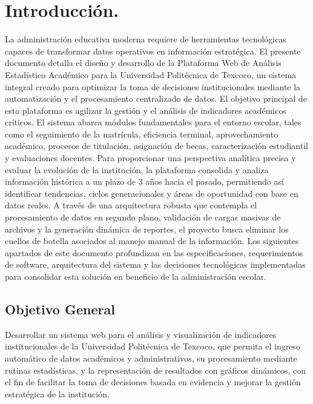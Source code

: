 \chapter{Introducción.}

 La administración educativa moderna requiere de herramientas tecnológicas capaces de transformar datos operativos en información estratégica. El presente documento detalla el diseño y desarrollo de la Plataforma Web de Análisis Estadístico Académico para la Universidad Politécnica de Texcoco, un sistema integral creado para optimizar la toma de decisiones institucionales mediante la automatización y el procesamiento centralizado de datos. El objetivo principal de esta plataforma es agilizar la gestión y el análisis de indicadores académicos críticos. 
 El sistema abarca módulos fundamentales para el entorno escolar, tales como el seguimiento de la matrícula, eficiencia terminal, aprovechamiento académico, procesos de titulación, asignación de becas, caracterización estudiantil y evaluaciones docentes. Para proporcionar una perspectiva analítica precisa y evaluar la evolución de la institución, la plataforma consolida y analiza información histórica a un plazo de 3 años hacia el pasado, permitiendo así identificar tendencias, ciclos generacionales y áreas de oportunidad con base en datos reales.  
 A través de una arquitectura robusta que contempla el procesamiento de datos en segundo plano, validación de cargas masivas de archivos y la generación dinámica de reportes, el proyecto busca eliminar los cuellos de botella asociados al manejo manual de la información. Los siguientes apartados de este documento profundizan en las especificaciones, requerimientos de software, arquitectura del sistema y las decisiones tecnológicas implementadas para consolidar esta solución en beneficio de la administración escolar.




 \section{Objetivo General}

Desarrollar un sistema web para el análisis y visualización de indicadores institucionales de la Universidad Politécnica de Texcoco, que permita el ingreso automático de datos académicos y administrativos, su procesamiento mediante rutinas estadísticas, y la representación de resultados con gráficos dinámicos, con el fin de facilitar la toma de decisiones basada en evidencia y mejorar la gestión estratégica de la institución.

